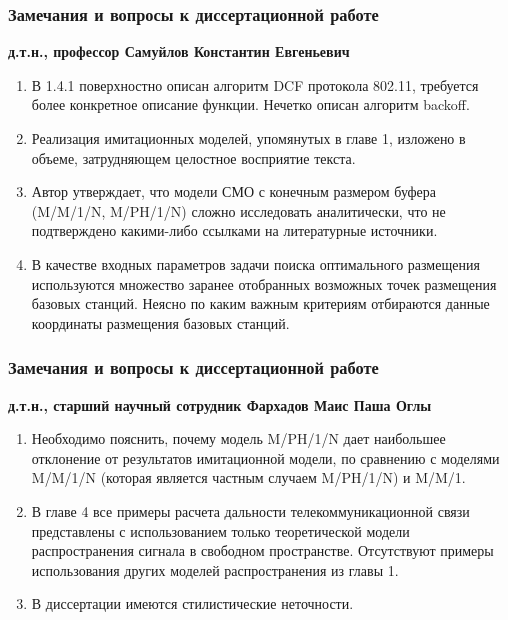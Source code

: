 \begin{frame}
    \frametitle{Замечания и вопросы к диссертационной работе}
    \fontsize{8pt}{7.2}\selectfont
    \textbf{д.т.н., профессор Самуйлов Константин Евгеньевич}

    \bigskip

    \begin{enumerate}
        \item В 1.4.1 поверхностно описан алгоритм DCF протокола 802.11, требуется более конкретное описание функции. Нечетко описан алгоритм backoff.
        \item Реализация имитационных моделей, упомянутых в главе 1, изложено в объеме, затрудняющем целостное восприятие текста.
        \item Автор утверждает, что модели СМО с конечным размером буфера (M/M/1/N, M/PH/1/N) сложно исследовать аналитически, что не подтверждено какими-либо ссылками на литературные источники. 
        
        \item В качестве входных параметров задачи поиска оптимального размещения используются множество заранее отобранных возможных точек размещения базовых станций. Неясно по каким важным критериям отбираются данные координаты размещения базовых станций.
        
    \end{enumerate}
\end{frame}


\begin{frame}
    \frametitle{Замечания и вопросы к диссертационной работе}
    \fontsize{8pt}{7.2}\selectfont
    \textbf{д.т.н., старший научный сотрудник Фархадов Маис Паша Оглы}

    \bigskip

    \begin{enumerate}
        \item Необходимо пояснить, почему модель M/PH/1/N дает наибольшее отклонение от результатов имитационной модели, по сравнению с моделями M/M/1/N (которая является частным случаем M/PH/1/N) и M/M/1.
        \item В главе 4 все примеры расчета дальности телекоммуникационной связи представлены с использованием только теоретической модели распространения сигнала в свободном пространстве. Отсутствуют примеры использования других моделей распространения из главы 1.
        \item В диссертации имеются стилистические неточности.
        
    \end{enumerate}
\end{frame}


